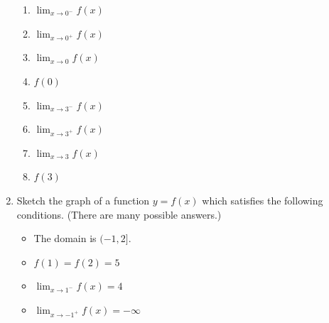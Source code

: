 \documentclass[12pt]{article}
\newif\ifans
\begin{document}
\begin{enumerate}
\begin{enumerate}
\item $\displaystyle \lim_{x \rightarrow 0^{-}}{f(x)}$

\ifans{\fbox{$2$}} \fi

\item $\displaystyle \lim_{x \rightarrow 0^{+}}{f(x)}$

\ifans{\fbox{$6$}} \fi

\item $\displaystyle \lim_{x \rightarrow 0}{f(x)}$

\ifans{\fbox{DNE because $\displaystyle \lim_{x \rightarrow 0^{-}}f(x) \neq \lim_{x \rightarrow 0^{+}}f(x)$}} \fi

\item $f(0)$

\ifans{\fbox{Undefined}} \fi

\item $\displaystyle \lim_{x \rightarrow 3^{-}}{f(x)}$

\ifans{\fbox{$-3$}} \fi

\item $\displaystyle \lim_{x \rightarrow 3^{+}}{f(x)}$

\ifans{\fbox{$-3$}} \fi

\item $\displaystyle \lim_{x \rightarrow 3}{f(x)}$

\ifans{\fbox{$-3$}} \fi

\item $f(3)$

\ifans{\fbox{$-3$}} \fi

\end{enumerate}

\item Sketch the graph of a function $y=f(x)$ which satisfies the following conditions. (There are many possible answers.)

\begin{itemize}

\item The domain is $(-1,2]$.

\item $f(1)=f(2)=5$

\item $\displaystyle \lim_{x\rightarrow 1^{-}}{f(x)}=4$

\item $\displaystyle \lim_{x\rightarrow -1^{+}}{f(x)}=-\infty$

\end{itemize}


\end{enumerate}
\end{document}
